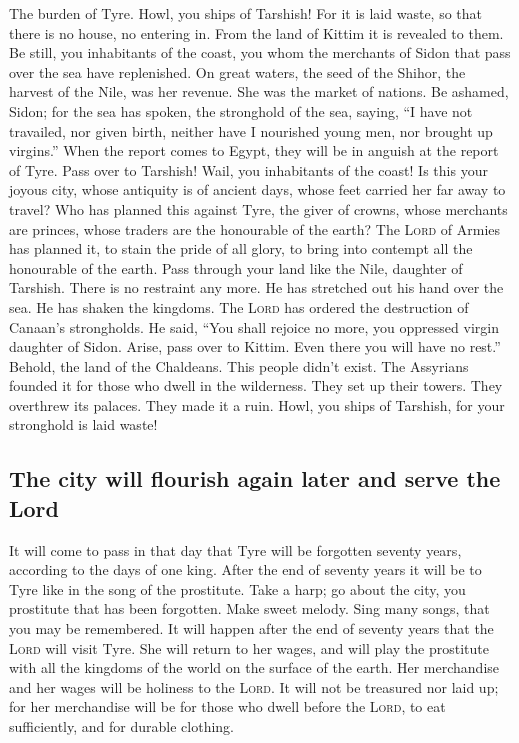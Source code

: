  The burden of Tyre. Howl, you ships of Tarshish! For it
is laid waste, so that there is no house, no entering in. From the land
of Kittim it is revealed to them.  Be still, you
inhabitants of the coast, you whom the merchants of Sidon that pass over
the sea have replenished.  On great waters, the seed of
the Shihor, the harvest of the Nile, was her revenue. She was the market
of nations.  Be ashamed, Sidon; for the sea has spoken,
the stronghold of the sea, saying, ``I have not travailed, nor given
birth, neither have I nourished young men, nor brought up virgins.''
 When the report comes to Egypt, they will be in anguish
at the report of Tyre.  Pass over to Tarshish! Wail, you
inhabitants of the coast!  Is this your joyous city, whose
antiquity is of ancient days, whose feet carried her far away to travel?
 Who has planned this against Tyre, the giver of crowns,
whose merchants are princes, whose traders are the honourable of the
earth?  The \textsc{Lord} of Armies has planned it, to
stain the pride of all glory, to bring into contempt all the honourable
of the earth.  Pass through your land like the Nile,
daughter of Tarshish. There is no restraint any more.  He
has stretched out his hand over the sea. He has shaken the kingdoms. The
\textsc{Lord} has ordered the destruction of Canaan's strongholds.
 He said, ``You shall rejoice no more, you oppressed
virgin daughter of Sidon. Arise, pass over to Kittim. Even there you
will have no rest.''  Behold, the land of the Chaldeans.
This people didn't exist. The Assyrians founded it for those who dwell
in the wilderness. They set up their towers. They overthrew its palaces.
They made it a ruin.  Howl, you ships of Tarshish, for
your stronghold is laid waste!

\hypertarget{the-city-will-flourish-again-later-and-serve-the-lord}{%
\subsection{The city will flourish again later and serve the
Lord}\label{the-city-will-flourish-again-later-and-serve-the-lord}}

 It will come to pass in that day that Tyre will be
forgotten seventy years, according to the days of one king. After the
end of seventy years it will be to Tyre like in the song of the
prostitute.  Take a harp; go about the city, you
prostitute that has been forgotten. Make sweet melody. Sing many songs,
that you may be remembered.  It will happen after the end
of seventy years that the \textsc{Lord} will visit Tyre. She will return
to her wages, and will play the prostitute with all the kingdoms of the
world on the surface of the earth.  Her merchandise and
her wages will be holiness to the \textsc{Lord}. It will not be
treasured nor laid up; for her merchandise will be for those who dwell
before the \textsc{Lord}, to eat sufficiently, and for durable clothing.


